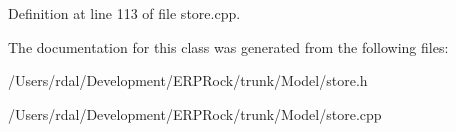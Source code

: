 \-Definition at line 113 of file store.\-cpp.



\-The documentation for this class was generated from the following files\-:\begin{DoxyCompactItemize}
\item 
/\-Users/rdal/\-Development/\-E\-R\-P\-Rock/trunk/\-Model/store.\-h\item 
/\-Users/rdal/\-Development/\-E\-R\-P\-Rock/trunk/\-Model/store.\-cpp\end{DoxyCompactItemize}
